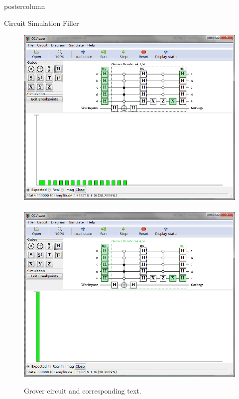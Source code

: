\documentclass[final]{beamer} %
\begin{document}
\begin{frame}{}
\begin{columns}
\begin{column}{.33\textwidth}
\begin{beamercolorbox}[center,wd=\textwidth]{postercolumn}
\begin{minipage}[T]{.95\textwidth}
\begin{block}{\large Circuit Simulation}
	         Filler

                    \centering 
		\begin{figure}[!htbp]
		  \centering
		  \includegraphics[width=7in]{figures/Grover_Simulate1.png} \ \  \includegraphics[width=7in]{figures/Grover_Simulate2.png}
		  \caption{Grover circuit and corresponding text.}
		\end{figure}

           \end{block}


\end{minipage}
\end{beamercolorbox}
\end{column}
\end{columns}
\end{frame}
\end{document}
